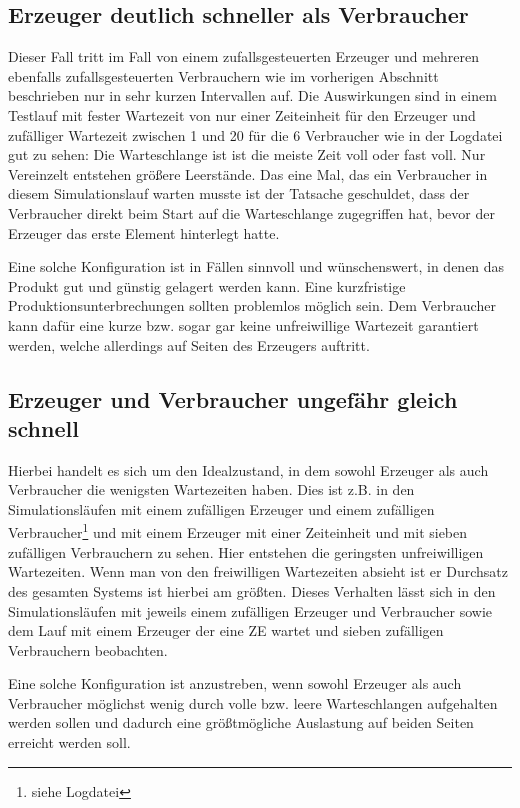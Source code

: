 \subsection{Erzeuger deutlich schneller als Verbraucher} %
\label{sub:erzeuger_schneller_als_verbraucher}
Dieser Fall tritt im Fall von einem zufallsgesteuerten Erzeuger und mehreren ebenfalls zufallsgesteuerten Verbrauchern wie im vorherigen Abschnitt beschrieben nur in sehr kurzen Intervallen auf. Die Auswirkungen sind in einem Testlauf mit fester Wartezeit von nur einer Zeiteinheit für den Erzeuger und zufälliger Wartezeit zwischen 1 und 20 für die 6 Verbraucher wie in der Logdatei  gut zu sehen: Die Warteschlange ist ist die meiste Zeit voll oder fast voll. Nur Vereinzelt entstehen größere Leerstände. Das eine Mal, das ein Verbraucher in diesem Simulationslauf warten musste ist der Tatsache geschuldet, dass der Verbraucher direkt beim Start auf die Warteschlange zugegriffen hat, bevor der Erzeuger das erste Element hinterlegt hatte.

Eine solche Konfiguration ist in Fällen sinnvoll und wünschenswert, in denen das Produkt gut und günstig gelagert werden kann. Eine kurzfristige Produktionsunterbrechungen sollten problemlos möglich sein. Dem Verbraucher kann dafür eine kurze bzw. sogar gar keine unfreiwillige Wartezeit garantiert werden, welche allerdings auf Seiten des Erzeugers auftritt.

\subsection{Erzeuger und Verbraucher ungefähr gleich schnell} %
\label{sub:erzeuger_und_verbraucher_gleich_schnell}
Hierbei handelt es sich um den Idealzustand, in dem sowohl Erzeuger als auch Verbraucher die wenigsten Wartezeiten haben. Dies ist z.B. in den Simulationsläufen mit einem zufälligen Erzeuger und einem zufälligen Verbraucher\footnote{siehe Logdatei } und mit einem Erzeuger mit einer Zeiteinheit und mit sieben zufälligen Verbrauchern zu sehen. Hier entstehen die geringsten unfreiwilligen Wartezeiten. Wenn man von den freiwilligen Wartezeiten absieht ist er Durchsatz des gesamten Systems ist hierbei am größten. Dieses Verhalten lässt sich in den Simulationsläufen mit jeweils einem zufälligen Erzeuger und Verbraucher sowie dem Lauf mit einem Erzeuger der eine \ac{ZE} wartet und sieben zufälligen Verbrauchern beobachten.

Eine solche Konfiguration ist anzustreben, wenn sowohl Erzeuger als auch Verbraucher möglichst wenig durch volle bzw. leere Warteschlangen aufgehalten werden sollen und dadurch eine größtmögliche Auslastung auf beiden Seiten erreicht werden soll.


